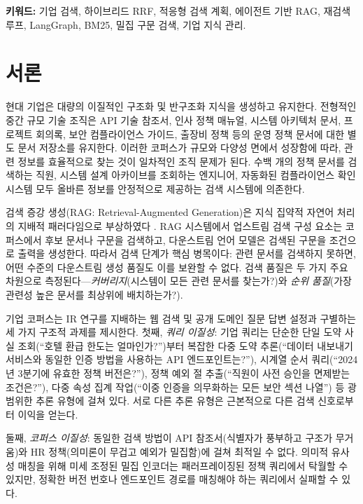 \documentclass[11pt, a4paper]{article}
\begin{document}
\noindent\textbf{키워드:} 기업 검색, 하이브리드 RRF, 적응형 검색 계획, 에이전트 기반 RAG, 재검색 루프, LangGraph, BM25, 밀집 구문 검색, 기업 지식 관리.

\section{서론}
\label{sec:intro}

현대 기업은 대량의 이질적인 구조화 및 반구조화 지식을 생성하고 유지한다. 전형적인 중간 규모 기술 조직은 API 기술 참조서, 인사 정책 매뉴얼, 시스템 아키텍처 문서, 프로젝트 회의록, 보안 컴플라이언스 가이드, 출장비 정책 등의 운영 정책 문서에 대한 별도 문서 저장소를 유지한다. 이러한 코퍼스가 규모와 다양성 면에서 성장함에 따라, 관련 정보를 효율적으로 찾는 것이 일차적인 조직 문제가 된다. 수백 개의 정책 문서를 검색하는 직원, 시스템 설계 아카이브를 조회하는 엔지니어, 자동화된 컴플라이언스 확인 시스템 모두 올바른 정보를 안정적으로 제공하는 검색 시스템에 의존한다.

검색 증강 생성(RAG: Retrieval-Augmented Generation)은 지식 집약적 자연어 처리의 지배적 패러다임으로 부상하였다 \citep{lewis2020rag}. RAG 시스템에서 업스트림 검색 구성 요소는 코퍼스에서 후보 문서나 구문을 검색하고, 다운스트림 언어 모델은 검색된 구문을 조건으로 출력을 생성한다. 따라서 검색 단계가 핵심 병목이다: 관련 문서를 검색하지 못하면, 어떤 수준의 다운스트림 생성 품질도 이를 보완할 수 없다. 검색 품질은 두 가지 주요 차원으로 측정된다---\emph{커버리지}(시스템이 모든 관련 문서를 찾는가?)와 \emph{순위 품질}(가장 관련성 높은 문서를 최상위에 배치하는가?).

기업 코퍼스는 IR 연구를 지배하는 웹 검색 및 공개 도메인 질문 답변 설정과 구별하는 세 가지 구조적 과제를 제시한다. 첫째, \emph{쿼리 이질성}: 기업 쿼리는 단순한 단일 도약 사실 조회(``호텔 환급 한도는 얼마인가?'')부터 복잡한 다중 도약 추론(``데이터 내보내기 서비스와 동일한 인증 방법을 사용하는 API 엔드포인트는?''), 시계열 순서 쿼리(``2024년 3분기에 유효한 정책 버전은?''), 정책 예외 절 추출(``직원이 사전 승인을 면제받는 조건은?''), 다중 속성 집계 작업(``이중 인증을 의무화하는 모든 보안 섹션 나열'') 등 광범위한 추론 유형에 걸쳐 있다. 서로 다른 추론 유형은 근본적으로 다른 검색 신호로부터 이익을 얻는다.

둘째, \emph{코퍼스 이질성}: 동일한 검색 방법이 API 참조서(식별자가 풍부하고 구조가 무거움)와 HR 정책(의미론이 무겁고 예외가 밀집함)에 걸쳐 최적일 수 없다. 의미적 유사성 매칭을 위해 미세 조정된 밀집 인코더는 패러프레이징된 정책 쿼리에서 탁월할 수 있지만, 정확한 버전 번호나 엔드포인트 경로를 매칭해야 하는 쿼리에서 실패할 수 있다.
\end{document}
